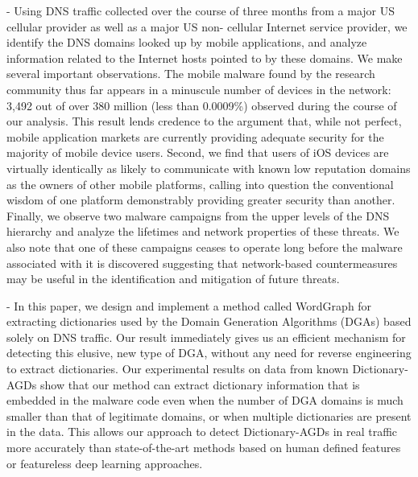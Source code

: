 \cite{lever2013core} - Using DNS traffic collected over the course of three months from a major US cellular provider as well as a major US non- cellular Internet service provider, we identify the DNS domains looked up by mobile applications, and analyze information related to the Internet hosts pointed to by these domains. We make several important observations. The mobile malware found by the research community thus far appears in a minuscule number of devices in the network: 3,492 out of over 380 million (less than 0.0009\%) observed during the course of our analysis. This result lends credence to the argument that, while not perfect, mobile application markets are currently providing adequate security for the majority of mobile device users. Second, we find that users of iOS devices are virtually identically as likely to communicate with known low reputation domains as the owners of other mobile platforms, calling into question the conventional wisdom of one platform demonstrably providing greater security than another. Finally, we observe two malware campaigns from the upper levels of the DNS hierarchy and analyze the lifetimes and network properties of these threats. We also note that one of these campaigns ceases to operate long before the malware associated with it is discovered suggesting that network-based countermeasures may be useful in the identification and mitigation of future threats.

\cite{pereira2018dictionary} - In this paper, we design and implement a method called WordGraph for extracting dictionaries used by the Domain Generation Algorithms (DGAs) based solely on DNS traffic. Our result immediately gives us an efficient mechanism for detecting this elusive, new type of DGA, without any need for reverse engineering to extract dictionaries. Our experimental results on data from known Dictionary-AGDs show that our method can extract dictionary information that is embedded in the malware code even when the number of DGA domains is much smaller than that of legitimate domains, or when multiple dictionaries are present in the data. This allows our approach to detect Dictionary-AGDs in real traffic more accurately than state-of-the-art methods based on human defined features or featureless deep learning approaches.
